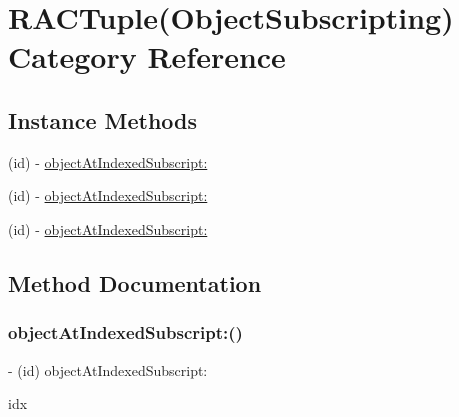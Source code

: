 \hypertarget{category_r_a_c_tuple_07_object_subscripting_08}{}\section{R\+A\+C\+Tuple(Object\+Subscripting) Category Reference}
\label{category_r_a_c_tuple_07_object_subscripting_08}
\subsection*{Instance Methods}
\begin{DoxyCompactItemize}
\item 
(id) -\/ \mbox{\hyperlink{category_r_a_c_tuple_07_object_subscripting_08_ad2360332f752318fc924727c17eb67c9}{object\+At\+Indexed\+Subscript\+:}}
\item 
(id) -\/ \mbox{\hyperlink{category_r_a_c_tuple_07_object_subscripting_08_ad2360332f752318fc924727c17eb67c9}{object\+At\+Indexed\+Subscript\+:}}
\item 
(id) -\/ \mbox{\hyperlink{category_r_a_c_tuple_07_object_subscripting_08_ad2360332f752318fc924727c17eb67c9}{object\+At\+Indexed\+Subscript\+:}}
\end{DoxyCompactItemize}


\subsection{Method Documentation}
\mbox{\label{category_r_a_c_tuple_07_object_subscripting_08_ad2360332f752318fc924727c17eb67c9}} 
\subsubsection{\texorpdfstring{object\+At\+Indexed\+Subscript\+:()}{objectAtIndexedSubscript:()}\hspace{0.1cm}{\footnotesize\ttfamily [1/3]}}
{\footnotesize\ttfamily -\/ (id) object\+At\+Indexed\+Subscript\+: \begin{DoxyParamCaption}\item[{(N\+S\+U\+Integer)}]{idx }\end{DoxyParamCaption}}

